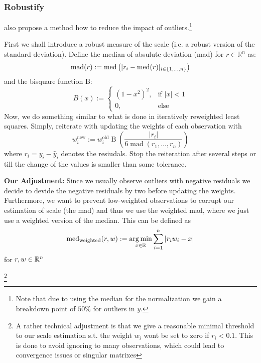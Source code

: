 \subsubsection{Robustify}
\cite{clevelandRobustLocallyWeighted1979} also propose a method how to reduce the impact of outliers.\footnote{Note that due to using the median for the normalization we gain a breakdown point of $50 \%$ for outliers in $y$.}

First we shall introduce a robust measure of the scale (i.e. a robust version of the standard deviation). Define the median of absulute deviation (mad) for $r\in\mathbb R^n$ as:
\begin{equation}
  \operatorname{mad}(r) := \operatorname{med}\left(|r_i - \operatorname{med}(r)|_{i\in \{1,\dots,n\}}\right)
\end{equation}
and the bisquare function B:
$$
  B(x):=\begin{cases}
    \left(1-x^{2}\right)^{2}, & \text{if } |x|<1 \\
    0,                        & \text{else }
  \end{cases}
$$
Now, we do something similar to what is done in iteratively reweighted least squares. Simply, reiterate with updating the weights of each observation with
\begin{equation}
  w_i^\text{new}:=w_i^\text{old} \operatorname{B}\left(\frac{|r_i|}{6\operatorname{mad}\left(r_1,\dots,r_n\right)}\right)
  \label{eq:bisquare}
\end{equation}
where $r_i = y_i - \hat y_i$ denotes the resiudals. Stop the reiteration after several steps or till the change of the values is smaller than some tolerance.

\textbf{Our Adjustment:} Since we usually observe outliers with negative residuals we decide to devide the negative residuals by two before updating the weights. Furthermore, we want to prevent low-weighted observations to corrupt our estimation of scale (the mad) and thus we use the weighted mad, where we just use a weighted version of the median. This can be defined as
$$
  \operatorname{med}_\text{weighted}(r,w) := \operatorname*{arg\, min}_{x \in \mathbb{R}} \sum_{i=1}^n |r_iw_i -x|
$$
for $r,w\in \mathbb{R}^n$

\footnote{A rather technical adjustment is that we give a reasonable minimal threshold to our scale estimation s.t. the weight $w_i$ wont be set to zero if $r_i<0.1$. This is done to avoid ignoring to many observations, which could lead to convergence issues or singular matrixes}



